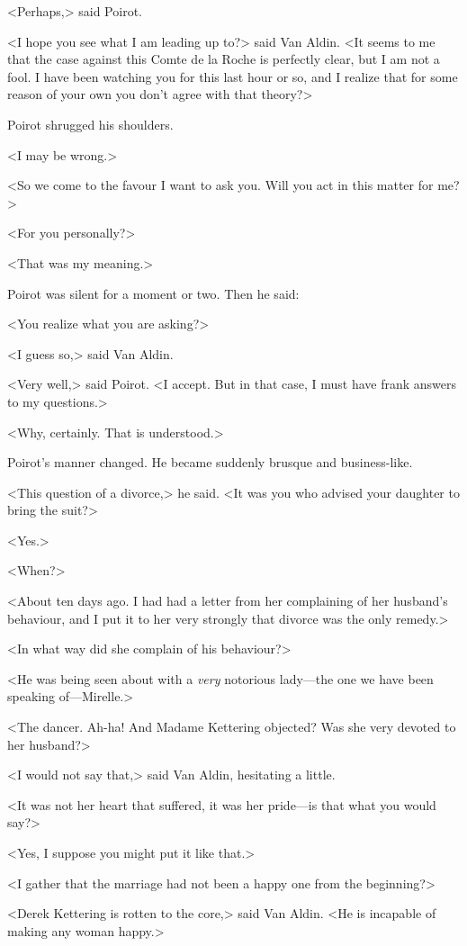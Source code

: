 <Perhaps,> said Poirot.

<I hope you see what I am leading up to?> said Van Aldin. <It seems to me that the case against this Comte de la Roche is perfectly clear, but I am not a fool. I have been watching you for this last hour or so, and I realize that for some reason of your own you don't agree with that theory?>

Poirot shrugged his shoulders.

<I may be wrong.>

<So we come to the favour I want to ask you. Will you act in this matter for me?>

<For you personally?>

<That was my meaning.>

Poirot was silent for a moment or two. Then he said:

<You realize what you are asking?>

<I guess so,> said Van Aldin.

<Very well,> said Poirot. <I accept. But in that case, I must have frank answers to my questions.>

<Why, certainly. That is understood.>

Poirot's manner changed. He became suddenly brusque and business-like.

<This question of a divorce,> he said. <It was you who advised your daughter to bring the suit?>

<Yes.>

<When?>

<About ten days ago. I had had a letter from her complaining of her husband's behaviour, and I put it to her very strongly that divorce was the only remedy.>

<In what way did she complain of his behaviour?>

<He was being seen about with a \emph{very} notorious lady—the one we have been speaking of—Mirelle.>

<The dancer. Ah-ha! And Madame Kettering objected? Was she very devoted to her husband?>

<I would not say that,> said Van Aldin, hesitating a little.

<It was not her heart that suffered, it was her pride—is that what you would say?>

<Yes, I suppose you might put it like that.>

<I gather that the marriage had not been a happy one from the beginning?>

<Derek Kettering is rotten to the core,> said Van Aldin. <He is incapable of making any woman happy.>

